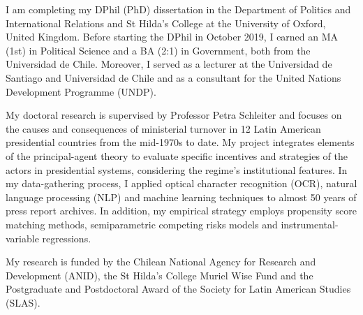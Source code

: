




\vspace{3mm}

\begin{cvparagraph}

I am completing my DPhil (PhD) dissertation in the Department of Politics and International Relations and St Hilda’s College at the University of Oxford, United Kingdom. Before starting the DPhil in October 2019, I earned an MA (1st) in Political Science and a BA (2:1) in Government, both from the Universidad de Chile. Moreover, I served as a lecturer at the Universidad de Santiago and Universidad de Chile and as a consultant for the United Nations Development Programme (UNDP).

My doctoral research is supervised by Professor Petra Schleiter and focuses on the causes and consequences of ministerial turnover in 12 Latin American presidential countries from the mid-1970s to date. My project integrates elements of the principal-agent theory to evaluate specific incentives and strategies of the actors in presidential systems, considering the regime’s institutional features. In my data-gathering process, I applied optical character recognition (OCR), natural language processing (NLP) and machine learning techniques to almost 50 years of press report archives. In addition, my empirical strategy employs propensity score matching methods, semiparametric competing risks models and instrumental-variable regressions.

My research is funded by the Chilean National Agency for Research and Development (ANID), the St Hilda’s College Muriel Wise Fund and the Postgraduate and Postdoctoral Award of the Society for Latin American Studies (SLAS).
\vspace{1mm}
\end{cvparagraph}
